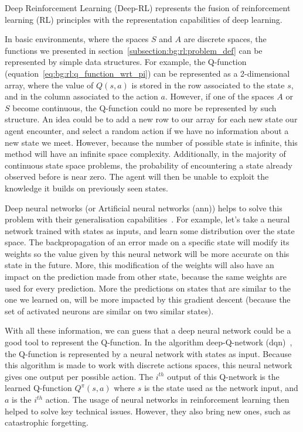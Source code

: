 Deep Reinforcement Learning (Deep-RL) represents the fusion of reinforcement learning (RL) principles with the
representation capabilities of deep learning.

In basic environments, where the spaces $S$ and $A$ are discrete spaces, the functions we presented in
section~\ref{subsection:bg:rl:problem_def} can be represented by simple data structures.
For example, the Q-function (equation~\ref{eq:bg:rl:q_function_wrt_pi}) can be represented as a 2-dimensional array,
where the value of $Q(s, a)$ is stored in the row associated to the state $s$, and in the column associated to the
action $a$.
However, if one of the spaces $A$ or $S$ become continuous, the Q-function could no more be represented by such
structure.
An idea could be to add a new row to our array for each new state our agent encounter, and select a random action if we
have no information about a new state we meet.
However, because the number of possible state is infinite, this method will have an infinite space complexity.
Additionally, in the majority of continuous state space problems, the probability of encountering a state already
observed before is near zero.
The agent will then be unable to exploit the knowledge it builds on previously seen states.

Deep neural networks (or Artificial neural networks (\acrshort{ann})) helps to solve this problem with their
generalisation capabilities~\citep{zhang2021understanding}.
For example, let's take a neural network trained with states as inputs, and learn some distribution over the state
space.
The backpropagation of an error made on a specific state will modify its weights so the value given by this neural
network will be more accurate on this state in the future.
More, this modification of the weights will also have an impact on the prediction made from other state,
because the same weights are used for every prediction.
More the predictions on states that are similar to the one we learned on, will be more impacted by this gradient
descent (because the set of activated neurons are similar on two similar states).

With all these information, we can guess that a deep neural network could be a good tool to represent the Q-function.
In the algorithm deep-Q-network (\acrshort{dqn})~\citep{mnih2013playing}, the Q-function is represented by a neural network with
states as input.
Because this algorithm is made to work with discrete actions spaces, this neural network gives one output per possible
action.
The $i^{th}$ output of this Q-network is the learned Q-function $Q^\pi(s, a)$ where $s$ is the state used as the
network input, and $a$ is the $i^{th}$ action.
The usage of neural networks in reinforcement learning then helped to solve key technical issues.
However, they also bring new ones, such as catastrophic forgetting.


